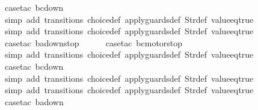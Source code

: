 \begin{isabellebody}
\ {\isacharparenleft}case{\isacharunderscore}tac\ {\isachardoublequoteopen}bc{\isacharequal}down{}{}{\isachardoublequoteclose}{\isacharparenright}\isanewline
\ \ \ \ \ \isamarkupfalse%
\ {\isacharparenleft}simp\ add{\isacharcolon}\ transitions\ choice{\isacharunderscore}def\ apply{\isacharunderscore}guards{\isacharunderscore}def\ Str{\isacharunderscore}def\ value{\isacharunderscore}eq{\isacharunderscore}true{\isacharparenright}\isanewline
\ \ \ \ \isamarkupfalse%
\ {\isacharparenleft}simp\ add{\isacharcolon}\ transitions\ choice{\isacharunderscore}def\ apply{\isacharunderscore}guards{\isacharunderscore}def\ Str{\isacharunderscore}def\ value{\isacharunderscore}eq{\isacharunderscore}true{\isacharparenright}\isanewline
\ \isamarkupfalse%
\ {\isacharparenleft}case{\isacharunderscore}tac\ {\isachardoublequoteopen}ba{\isacharequal}down{}{}stop{\isachardoublequoteclose}{\isacharparenright}\isanewline
\ \ \ \ \isamarkupfalse%
\ {\isacharparenleft}case{\isacharunderscore}tac\ {\isachardoublequoteopen}bc{\isacharequal}motorstop{}{\isachardoublequoteclose}{\isacharparenright}\isanewline
\ \ \ \ \ \isamarkupfalse%
\ {\isacharparenleft}simp\ add{\isacharcolon}\ transitions\ choice{\isacharunderscore}def\ apply{\isacharunderscore}guards{\isacharunderscore}def\ Str{\isacharunderscore}def\ value{\isacharunderscore}eq{\isacharunderscore}true{\isacharparenright}\isanewline
\ \ \ \ \isamarkupfalse%
\ {\isacharparenleft}case{\isacharunderscore}tac\ {\isachardoublequoteopen}bc{\isacharequal}down{}{}{\isachardoublequoteclose}{\isacharparenright}\isanewline
\ \ \ \ \ \isamarkupfalse%
\ {\isacharparenleft}simp\ add{\isacharcolon}\ transitions\ choice{\isacharunderscore}def\ apply{\isacharunderscore}guards{\isacharunderscore}def\ Str{\isacharunderscore}def\ value{\isacharunderscore}eq{\isacharunderscore}true{\isacharparenright}\isanewline
\ \ \isamarkupfalse%
\ {\isacharparenleft}simp\ add{\isacharcolon}\ transitions\ choice{\isacharunderscore}def\ apply{\isacharunderscore}guards{\isacharunderscore}def\ Str{\isacharunderscore}def\ value{\isacharunderscore}eq{\isacharunderscore}true{\isacharparenright}\isanewline
\ \isamarkupfalse%
\ {\isacharparenleft}case{\isacharunderscore}tac\ {\isachardoublequoteopen}ba{\isacharequal}down{}{}{\isachardoublequoteclose}{\isacharparenright}\isanewline
\ \ \ \ \isamarkupfalse%

\end{isabellebody}
